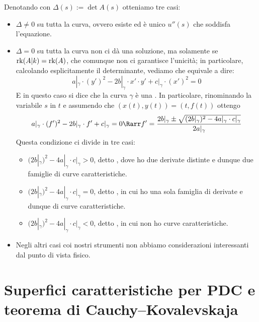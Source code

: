 \documentclass{article}
\begin{document}
Denotando con $\Delta(s) := \det A(s)$ otteniamo tre casi:\begin{itemize}
    \item $\Delta \neq 0$ su tutta la curva, ovvero esiste ed è unico $u''(s)$ che soddisfa l'equazione.
    \item $\Delta = 0$ su tutta la curva  non ci dà una soluzione, ma solamente se $\operatorname{rk}(A|k) = \operatorname{rk}(A)$, che comunque non ci garantisce l'unicità; in particolare, calcolando esplicitamente il determinante, vediamo che equivale a dire:
    \[ a|_\gamma \cdot (y')^2 - 2b|_\gamma \cdot x' \cdot y' + c|_\gamma \cdot (x')^2=0  \]
    E in questo caso si dice che la curva $\gamma$ è una . In particolare, rinominando la variabile $s$ in $t$ e assumendo che  $(x(t),y(t)) = (t, f(t))$ ottengo 
    \[ a|_\gamma \cdot (f')^2 - 2b|_\gamma \cdot f' + c|_\gamma =0 \Rarr f' = \frac{ 2b|_\gamma \pm \sqrt{(2b|_\gamma)^2 - 4 a|_\gamma \cdot c|_\gamma} }{2a|_\gamma} \]
    Questa condizione ci divide in tre casi:\begin{itemize}
        \item $(2b|_\gamma)^2 - 4 a|_\gamma \cdot c|_\gamma > 0$, detto , dove ho due derivate distinte e dunque due famiglie di curve caratteristiche.
        \item $(2b|_\gamma)^2 - 4 a|_\gamma \cdot c|_\gamma = 0$, detto , in cui ho una sola famiglia di derivate e dunque di curve caratteristiche.
        \item $(2b|_\gamma)^2 - 4 a|_\gamma \cdot c|_\gamma < 0$, detto , in cui non ho curve caratteristiche.
    \end{itemize}
    \item Negli altri casi coi nostri strumenti non abbiamo considerazioni interessanti dal punto di vista fisico.
\end{itemize}

\section{Superfici caratteristiche per PDC e teorema di Cauchy--Kovalevskaja}
\end{document}
